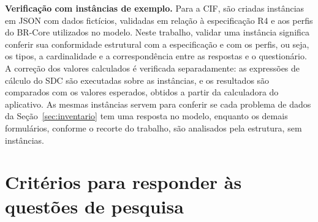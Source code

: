 \textbf{Verificação com instâncias de exemplo.} Para a CIF, são criadas instâncias em JSON com dados fictícios,
validadas em relação à especificação R4 e aos perfis do BR-Core utilizados no modelo. Neste trabalho, validar uma
instância significa conferir sua conformidade estrutural com a especificação e com os perfis, ou seja, os tipos, a
cardinalidade e a correspondência entre as respostas e o questionário. A correção dos valores calculados é verificada
separadamente: as expressões de cálculo do SDC são executadas sobre as instâncias, e os resultados são comparados com
os valores esperados, obtidos a partir da calculadora do aplicativo. As mesmas instâncias servem para conferir se
cada problema de dados da Seção~\ref{sec:inventario} tem uma resposta no modelo, enquanto os demais formulários,
conforme o recorte do trabalho, são analisados pela estrutura, sem instâncias.

\section{Critérios para responder às questões de pesquisa}
\label{sec:criterios}

